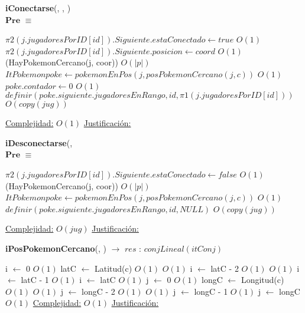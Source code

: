 \begin{algorithm}[H]{\textbf{iConectarse}(, , )}
	{\\ $\textbf{Pre}$ $\equiv$ }
	\begin{algorithmic}
		\State $\pi 2(j.jugadoresPorID[id]).Siguiente.estaConectado \gets true $ \Comment $O(1)$
		\State $\pi 2(j.jugadoresPorID[id]).Siguiente.posicion \gets coord $ \Comment $O(1)$
		\If(HayPokemonCercano(j, coor)) \Comment $O(|p|)$
		\State $ItPokemon poke \gets pokemonEnPos(j,posPokemonCercano(j,c))$ \Comment $O(1)$
		\State $poke.contador \gets 0$ \Comment $O(1)$
	\State $ definir(poke.siguiente.jugadoresEnRango,id,\pi 1(j.jugadoresPorID[id])) $ \Comment $O(copy(jug))$
		\EndIf
	
		\medskip
		\Statex \underline{Complejidad:} $O(1)$
		\Statex \underline{Justificación:}  
    \end{algorithmic}
\end{algorithm}

\begin{algorithm}[H]{\textbf{iDesconectarse}(, } 
	{\\ $\textbf{Pre}$ $\equiv$ }
	\begin{algorithmic}
		\State $\pi 2(j.jugadoresPorID[id]).Siguiente.estaConectado \gets false $ \Comment $O(1)$
		\If(HayPokemonCercano(j, coor)) \Comment $O(|p|)$
		\State $ItPokemon poke \gets pokemonEnPos(j,posPokemonCercano(j,c))$ \Comment $O(1)$
		\State $definir(poke.siguiente.jugadoresEnRango,id,NULL) $ \Comment $O(copy(jug))$
		\EndIf
	
		\medskip
		\Statex \underline{Complejidad:} $O(jug)$
		\Statex \underline{Justificación:}  
    \end{algorithmic}
\end{algorithm}

\begin{algorithm}[H]{\textbf{iPosPokemonCercano}(, )  $\to$ $res$ : $conjLineal(itConj)$} 
	{}
	\begin{algorithmic}
		\State i $\gets$ 0 \Comment $O(1)$
		\State latC $\gets$ Latitud(c)	\Comment $O(1)$
			\Comment $O(1)$
			\State i $\gets$ latC - 2	\Comment $O(1)$
		\Else
				\Comment $O(1)$
				\State i $\gets$ latC - 1	\Comment $O(1)$
			\Else
				\State i $\gets$ latC	\Comment $O(1)$
			\EndIf
		\EndIf
		\State j $\gets$ 0 \Comment $O(1)$
		\State longC $\gets$ Longitud(c)	\Comment $O(1)$
			\Comment $O(1)$
			\State j $\gets$ longC - 2	\Comment $O(1)$
		\Else
				\Comment $O(1)$
				\State j $\gets$ longC - 1	\Comment $O(1)$
			\Else
				\State j $\gets$ longC	\Comment $O(1)$
			\EndIf
		\EndIf
			\EndWhile
		\EndWhile
		\medskip
		\Statex \underline{Complejidad:} $O(1)$
		\Statex \underline{Justificación:} 
    \end{algorithmic}
\end{algorithm}

